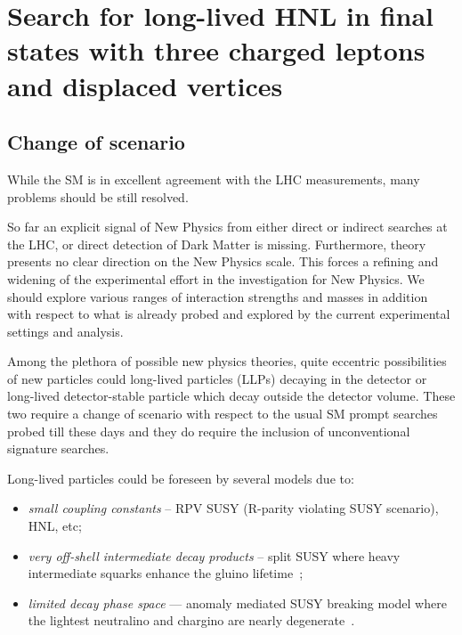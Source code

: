 \chapter{Search for long-lived HNL in final states
with three charged leptons and displaced vertices} \label{Chapter6} 

\section{Change of scenario}
While the SM is in excellent agreement with the LHC measurements, many problems
should be still resolved.

So far an explicit signal of New Physics from either direct or indirect
searches at the LHC, or direct detection of Dark Matter is
missing. Furthermore, theory presents no clear direction on the New Physics scale.
This forces a refining and widening of the experimental effort in the
investigation for New Physics. We should explore various ranges of
interaction strengths and masses in addition with respect to
what is already probed and explored by the current experimental
settings and analysis.

Among the plethora of possible new physics theories, quite eccentric
possibilities of new particles could long-lived particles (LLPs)
decaying in the detector or long-lived detector-stable particle which decay outside the detector volume. 
These two require a change of scenario with respect to the usual SM
prompt searches probed till these days and they do require the
inclusion of unconventional signature searches.

Long-lived particles could be foreseen by several models due to:
\begin{itemize}
\setlength\itemsep{-0.1em}
\item \emph{small coupling constants} -- \ie RPV SUSY (R-parity violating
  SUSY scenario), HNL, etc;
\item \emph{very off-shell intermediate decay products} -- \ie split SUSY where
heavy intermediate squarks enhance
the gluino lifetime~\cite{ATLAS-CONF-2019-006,2020135114};
\item \emph{limited decay phase space} --- \ie
anomaly mediated SUSY breaking
model where the lightest neutralino
and chargino are nearly degenerate~\cite{Sirunyan:2019wau,Sirunyan:2019gut}.
\end{itemize}

